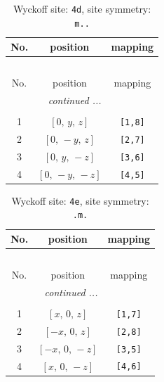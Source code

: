 \documentclass[fleqn,8pt]{jsarticle}
\begin{document}
\begin{longtable}{ccc}
\caption{Wyckoff site: {\tt 4d}, site symmetry: {\tt m..}}
 \\
 \hline \hline
No. & position & mapping \\ \hline \endfirsthead

\multicolumn{2}{l}{\tablename\ \thetable{}} \\
 \hline \hline
No. & position & mapping \\ \hline \endhead

 \hline \hline
\multicolumn{2}{r}{\footnotesize\it continued ...} \\ \endfoot

 \hline \hline
\multicolumn{2}{r}{} \\ \endlastfoot

1 & $\left[ 0,\, y,\, z \right]$ & {\tt [1,8]} \\ \hline
2 & $\left[ 0,\, - y,\, z \right]$ & {\tt [2,7]} \\ \hline
3 & $\left[ 0,\, y,\, - z \right]$ & {\tt [3,6]} \\ \hline
4 & $\left[ 0,\, - y,\, - z \right]$ & {\tt [4,5]} \\
\end{longtable}
\renewcommand{\arraystretch}{1.2}
\begin{longtable}{ccc}
\caption{Wyckoff site: {\tt 4e}, site symmetry: {\tt .m.}}
 \\
 \hline \hline
No. & position & mapping \\ \hline \endfirsthead

\multicolumn{2}{l}{\tablename\ \thetable{}} \\
 \hline \hline
No. & position & mapping \\ \hline \endhead

 \hline \hline
\multicolumn{2}{r}{\footnotesize\it continued ...} \\ \endfoot

 \hline \hline
\multicolumn{2}{r}{} \\ \endlastfoot

1 & $\left[ x,\, 0,\, z \right]$ & {\tt [1,7]} \\ \hline
2 & $\left[ - x,\, 0,\, z \right]$ & {\tt [2,8]} \\ \hline
3 & $\left[ - x,\, 0,\, - z \right]$ & {\tt [3,5]} \\ \hline
4 & $\left[ x,\, 0,\, - z \right]$ & {\tt [4,6]} \\
\end{longtable}
\renewcommand{\arraystretch}{1.2}
\end{document}
